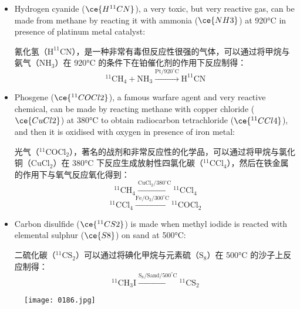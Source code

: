 \documentclass[dvipsnames, svgnames,a4paper,11pt]{article}
\begin{document}
\begin{itemize}
    \item Hydrogen cyanide (\(\ce{H^{11}CN}\)), a very toxic, but very reactive gas, can be made from methane by reacting it with ammonia (\(\ce{NH3}\)) at 920°C in presence of platinum metal catalyst:
    
    氰化氢（$\mathrm{H^{11}CN}$），是一种非常有毒但反应性很强的气体，可以通过将甲烷与氨气（$\mathrm{NH_3}$）在 920°C 的条件下在铂催化剂的作用下反应制得：
    \[
    \mathrm{^{11}CH_4 + NH_3 \xrightarrow{Pt/920^\circ C} H^{11}CN}
    \]
    
    \item Phosgene (\(\ce{^{11}COCl2}\)), a famous warfare agent and very reactive chemical, can be made by reacting methane with copper chloride (\(\ce{CuCl2}\)) at 380°C to obtain radiocarbon tetrachloride (\(\ce{^{11}CCl4}\)), and then it is oxidised with oxygen in presence of iron metal:
    
    光气（$\mathrm{^{11}COCl_2}$），著名的战剂和非常反应性的化学品，可以通过将甲烷与氯化铜（$\mathrm{CuCl_2}$）在 380°C 下反应生成放射性四氯化碳（$\mathrm{^{11}CCl_4}$），然后在铁金属的作用下与氧气反应氧化得到：
    \[
    \mathrm{^{11}CH_4 \xrightarrow{CuCl_2/380^\circ C} {}^{11}CCl_4}
    \]
    \[
    \mathrm{^{11}CCl_4 \xrightarrow{Fe/O_2/300^\circ C} {}^{11}COCl_2}
    \]
    
    \item Carbon disulfide (\(\ce{^{11}CS2}\)) is made when methyl iodide is reacted with elemental sulphur (\(\ce{S8}\)) on sand at 500°C:
    
    二硫化碳（$\mathrm{^{11}CS_2}$）可以通过将碘化甲烷与元素硫（$\mathrm{S_8}$）在 500°C 的沙子上反应制得：
    \[
    \mathrm{^{11}CH_3I \xrightarrow{S_8/Sand/500^\circ C} {}^{11}CS_2}
    \]
\end{itemize}



\begin{figure}[h]
	\centering
    \texttt{[image: 0186.jpg]}  
     \label{fig216}
\end{figure}
\end{document}
